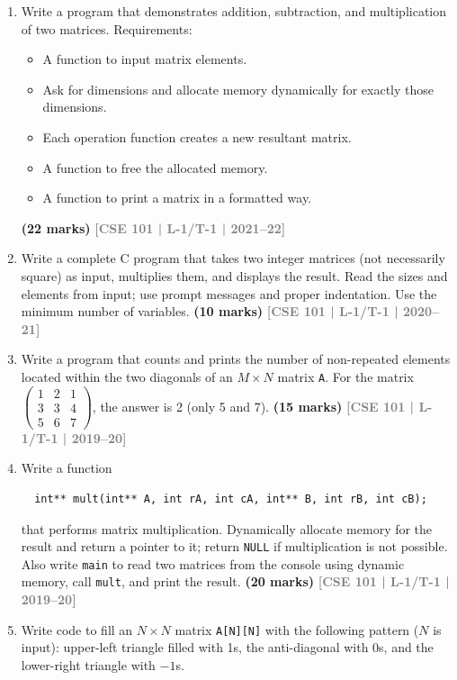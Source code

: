\documentclass[12pt,a3paper]{article}
\newcommand{\yr}[1]{\hfill\textcolor{gray}{\small\textbf{[#1]}}}
\newcommand{\mk}[1]{\textcolor{orange!70!black}{\small\textbf{(#1 marks)}}}
\begin{document}
\begin{enumerate}
\item Write a program that demonstrates addition, subtraction, and multiplication of two matrices. Requirements:
\begin{itemize}
  \item A function to input matrix elements.
  \item Ask for dimensions and allocate memory dynamically for exactly those dimensions.
  \item Each operation function creates a new resultant matrix.
  \item A function to free the allocated memory.
  \item A function to print a matrix in a formatted way.
\end{itemize}
\mk{22} \yr{CSE 101 | L-1/T-1 | 2021--22}

\item Write a complete C program that takes two integer matrices (not necessarily square) as input, multiplies them, and displays the result. Read the sizes and elements from input; use prompt messages and proper indentation. Use the minimum number of variables.
\mk{10} \yr{CSE 101 | L-1/T-1 | 2020--21}

\item Write a program that counts and prints the number of non-repeated elements located within the two diagonals of an $M \times N$ matrix \texttt{A}. For the matrix $\begin{pmatrix}1&2&1\\3&3&4\\5&6&7\end{pmatrix}$, the answer is 2 (only 5 and 7).
\mk{15} \yr{CSE 101 | L-1/T-1 | 2019--20}

\item Write a function 
\begin{lstlisting}
  int** mult(int** A, int rA, int cA, int** B, int rB, int cB); 
 \end{lstlisting} 
that performs matrix multiplication. Dynamically allocate memory for the result and return a pointer to it; return \texttt{NULL} if multiplication is not possible. Also write \texttt{main} to read two matrices from the console using dynamic memory, call \texttt{mult}, and print the result.
\mk{20} \yr{CSE 101 | L-1/T-1 | 2019--20}

\item Write code to fill an $N \times N$ matrix \texttt{A[N][N]} with the following pattern ($N$ is input): upper-left triangle filled with 1s, the anti-diagonal with 0s, and the lower-right triangle with $-1$s.


\end{enumerate}
\end{document}
